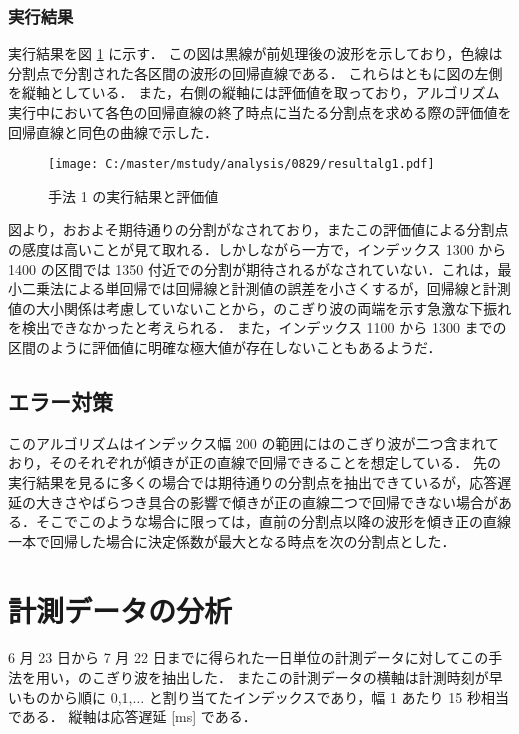 \documentclass[a4j]{jarticle}
\begin{document}
\subsubsection{実行結果}
実行結果を図 \ref{resultalg1} に示す．
この図は黒線が前処理後の波形を示しており，色線は分割点で分割された各区間の波形の回帰直線である．
これらはともに図の左側を縦軸としている．
また，右側の縦軸には評価値を取っており，アルゴリズム実行中において各色の回帰直線の終了時点に当たる分割点を求める際の評価値を回帰直線と同色の曲線で示した．
\begin{figure}[tb]
\begin{center}
\texttt{[image: C:/master/mstudy/analysis/0829/resultalg1.pdf]}
\caption{手法 1 の実行結果と評価値}
\label{resultalg1}
\end{center}
\end{figure}

図より，おおよそ期待通りの分割がなされており，またこの評価値による分割点の感度は高いことが見て取れる．しかしながら一方で，インデックス 1300 から 1400 の区間では 1350 付近での分割が期待されるがなされていない．これは，最小二乗法による単回帰では回帰線と計測値の誤差を小さくするが，回帰線と計測値の大小関係は考慮していないことから，のこぎり波の両端を示す急激な下振れを検出できなかったと考えられる．
また，インデックス 1100 から 1300 までの区間のように評価値に明確な極大値が存在しないこともあるようだ．

\subsection{エラー対策}
このアルゴリズムはインデックス幅 200 の範囲にはのこぎり波が二つ含まれており，そのそれぞれが傾きが正の直線で回帰できることを想定している．
先の実行結果を見るに多くの場合では期待通りの分割点を抽出できているが，応答遅延の大きさやばらつき具合の影響で傾きが正の直線二つで回帰できない場合がある．そこでこのような場合に限っては，直前の分割点以降の波形を傾き正の直線一本で回帰した場合に決定係数が最大となる時点を次の分割点とした．
\section{計測データの分析}
6 月 23 日から 7 月 22 日までに得られた一日単位の計測データに対してこの手法を用い，のこぎり波を抽出した．
またこの計測データの横軸は計測時刻が早いものから順に 0,1,$\ldots$ と割り当てたインデックスであり，幅 1 あたり 15 秒相当である．
縦軸は応答遅延 [ms] である．
\end{document}
